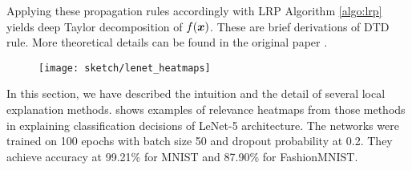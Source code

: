 Applying these propagation rules accordingly with LRP Algorithm \ref{algo:lrp} yields deep Taylor decomposition of  $f(\boldsymbol{x})$. These are brief derivations of DTD rule. More theoretical details can be found in the original paper \citep{MontavonExplainingnonlinearclassification2017}.





\begin{figure}[!htb]
\centering
\texttt{[image: sketch/lenet\_heatmaps]}
\label{fig:lenet_heatmaps}
\end{figure}

In this section, we have described the intuition and the detail of several local explanation methods. \addfigure{\ref{fig:lenet_heatmaps}} shows  examples of relevance heatmaps from those methods in explaining classification decisions of LeNet-5 \citep{LeCunGradientBasedLearningApplied2001} architecture. The networks were trained on 100 epochs with batch size 50 and dropout probability at 0.2. They achieve accuracy at 99.21\% for MNIST and 87.90\% for FashionMNIST. 

